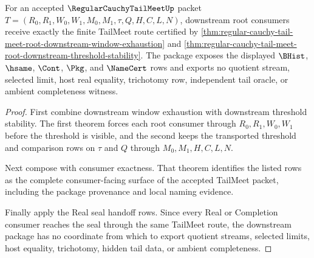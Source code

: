 \begin{theorem}
\label{thm:regular-cauchy-tail-meet-root-downstream-nonescape-package}
For an accepted $\RegularCauchyTailMeetUp$ packet
$T=(R_0,R_1,W_0,W_1,M_0,M_1,\tau,Q,H,C,L,N)$, downstream root consumers receive
exactly the finite TailMeet route certified by
\autoref{thm:regular-cauchy-tail-meet-root-downstream-window-exhaustion} and
\autoref{thm:regular-cauchy-tail-meet-root-downstream-threshold-stability}. The
package exposes the displayed $\BHist$, $\hsame$, $\Cont$, $\Pkg$, and
$\NameCert$ rows and exports no quotient stream, selected limit, host real
equality, trichotomy row, independent tail oracle, or ambient completeness
witness.
\end{theorem}
\begin{proof}
First combine downstream window exhaustion with downstream threshold stability.
The first theorem forces each root consumer through $R_0,R_1,W_0,W_1$ before the
threshold is visible, and the second keeps the transported threshold and
comparison rows on $\tau$ and $Q$ through $M_0,M_1,H,C,L,N$.

Next compose with consumer exactness. That theorem identifies the listed rows as
the complete consumer-facing surface of the accepted TailMeet packet, including
the package provenance and local naming evidence.

Finally apply the Real seal handoff rows. Since every Real or Completion
consumer reaches the seal through the same TailMeet route, the downstream
package has no coordinate from which to export quotient streams, selected
limits, host equality, trichotomy, hidden tail data, or ambient completeness.
\end{proof}

